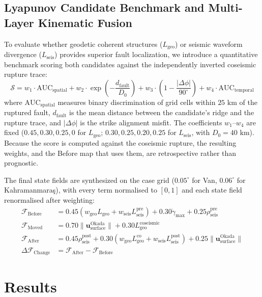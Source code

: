 \documentclass[11pt,a4paper]{article}
\begin{document}
\subsection{Lyapunov Candidate Benchmark and Multi-Layer Kinematic Fusion}
To evaluate whether geodetic coherent structures ($L_{\text{geo}}$) or seismic waveform divergence ($L_{\text{seis}}$) provides superior fault localization, we introduce a quantitative benchmark scoring both candidates against the independently inverted coseismic rupture trace:
\begin{equation}
\mathcal{S} = w_1 \cdot \text{AUC}_{\text{spatial}} + w_2 \cdot \exp\left(-\frac{d_{\text{fault}}}{D_0}\right) + w_3 \cdot \left(1 - \frac{|\Delta \phi|}{90^\circ}\right) + w_4 \cdot \text{AUC}_{\text{temporal}}
\end{equation}
where $\text{AUC}_{\text{spatial}}$ measures binary discrimination of grid cells within $25\text{ km}$ of the ruptured fault, $d_{\text{fault}}$ is the mean distance between the candidate's ridge and the rupture trace, and $|\Delta \phi|$ is the strike alignment misfit. The coefficients $w_1$--$w_4$ are fixed ($0.45, 0.30, 0.25, 0$ for $L_{\text{geo}}$; $0.30, 0.25, 0.20, 0.25$ for $L_{\text{seis}}$, with $D_0 = 40\text{ km}$). Because the score is computed against the coseismic rupture, the resulting weights, and the Before map that uses them, are retrospective rather than prognostic.

The final state fields are synthesized on the case grid ($0.05^\circ$ for Van, $0.06^\circ$ for Kahramanmara\c{s}), with every term normalised to $[0, 1]$ and each state field renormalised after weighting:
\begin{align}
\mathcal{F}_{\text{Before}} &= 0.45 (w_{\text{geo}} L_{\text{geo}} + w_{\text{seis}} L_{\text{seis}}^{\text{pre}}) + 0.30 \dot{\gamma}_{\max} + 0.25 \rho_{\text{seis}}^{\text{pre}} \\
\mathcal{F}_{\text{Moved}} &= 0.70 \|\mathbf{u}_{\text{surface}}^{\text{Okada}}\| + 0.30 L_{\text{geo}}^{\text{coseismic}} \\
\mathcal{F}_{\text{After}} &= 0.45 \rho_{\text{seis}}^{\text{post}} + 0.30 (w_{\text{geo}} L_{\text{geo}}^{\text{co}} + w_{\text{seis}} L_{\text{seis}}^{\text{post}}) + 0.25 \|\mathbf{u}_{\text{surface}}^{\text{Okada}}\| \\
\Delta \mathcal{F}_{\text{Change}} &= \mathcal{F}_{\text{After}} - \mathcal{F}_{\text{Before}}
\end{align}

\section{Results}
\end{document}
